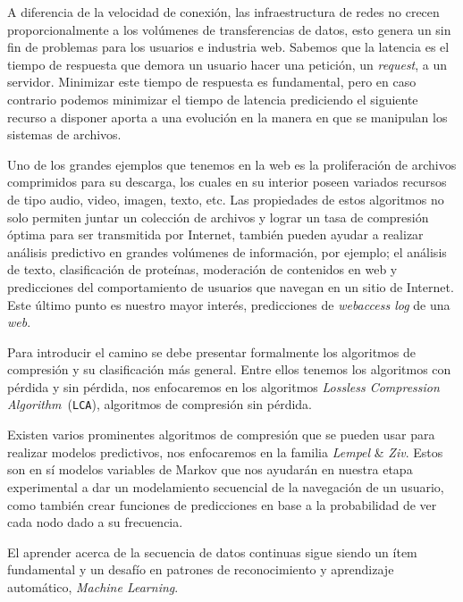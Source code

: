 A diferencia de la velocidad de conexión, las infraestructura de redes no crecen proporcionalmente a los volúmenes de transferencias de datos, esto genera un sin fin de problemas para los usuarios e industria web. Sabemos que la latencia es el tiempo de respuesta que demora un usuario hacer una petición, un \emph{request}, a un servidor. Minimizar este tiempo de respuesta es fundamental, pero en caso contrario podemos minimizar el tiempo de latencia prediciendo el siguiente recurso a disponer aporta a una evolución en la manera en que se manipulan los sistemas de archivos.
 
Uno de los grandes ejemplos que tenemos en la web es la proliferación de archivos comprimidos para su descarga, los cuales en su interior poseen variados recursos de tipo audio, video, imagen, texto, etc. Las propiedades de estos algoritmos no solo permiten juntar un colección de archivos y lograr un tasa de compresión óptima para ser transmitida por Internet, también pueden ayudar a realizar análisis predictivo en grandes volúmenes de información, por ejemplo; el análisis de texto, clasificación de proteínas, moderación de contenidos en web y predicciones del comportamiento de usuarios que navegan en un sitio de Internet. Este último punto es nuestro mayor interés,  predicciones de \emph{webaccess log} de una \emph{web}. 

Para introducir el camino se debe presentar formalmente los algoritmos de compresión y su clasificación más general. Entre ellos tenemos los algoritmos con pérdida y sin pérdida, nos enfocaremos en los algoritmos \emph{Lossless Compression Algorithm}~(\texttt{LCA}), algoritmos de compresión sin pérdida.

Existen varios prominentes algoritmos de compresión que se pueden usar para realizar modelos predictivos, nos enfocaremos en la familia \emph{Lempel} {\&} \emph{Ziv}. Estos son en sí modelos variables de Markov que nos ayudarán en nuestra etapa experimental a dar un modelamiento secuencial de la navegación de un usuario, como también crear funciones de predicciones en base a la probabilidad de ver cada nodo dado a su frecuencia.

El aprender acerca de la secuencia de datos continuas sigue siendo un ítem fundamental y un desafío en patrones de reconocimiento y aprendizaje automático, \emph{Machine Learning}.





